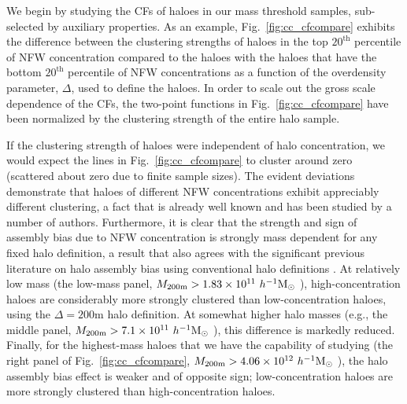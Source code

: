 \documentclass[usenatbib,fleqn]{mnras}
\begin{document}
We begin by studying the CFs of haloes in our mass threshold samples, sub-selected by auxiliary properties. As an example, Fig.~\ref{fig:cc_cfcompare} exhibits the difference between the clustering strengths of haloes in the top $20^{\mathrm{th}}$ percentile of NFW concentration compared to the haloes with the haloes that have the
bottom $20^{\mathrm{th}}$ percentile of NFW concentrations as a function of the overdensity parameter, $\Delta$, used to define the haloes. In order to scale out the gross scale dependence of the CFs, the two-point functions in Fig.~\ref{fig:cc_cfcompare} have been normalized by the clustering strength of the entire halo sample. 

If the clustering strength of haloes were independent of halo concentration, we would expect the lines in Fig.~\ref{fig:cc_cfcompare} to cluster around zero (scattered about zero due to finite sample sizes). The evident deviations demonstrate that haloes of different NFW concentrations exhibit appreciably different clustering, a fact that is already well known and has been studied by a number of authors. Furthermore, it is clear that the strength and sign of assembly bias due to NFW concentration is 
strongly mass dependent for any fixed halo definition, a result that also agrees with the significant previous literature on halo assembly bias using conventional halo definitions \citep{wechsler_etal02, gao_etal05, zentner07, wechsler_etal06, harker_etal06, croton_etal07, dalal_etal08, mao_etal15, sunayama_etal16}. At relatively low mass (the low-mass panel, $M_{200\text{m}} > 1.83 \times 10^{11} \ h^{-1}\mathrm{M}_{\odot}~$), high-concentration haloes are considerably more strongly clustered than low-concentration haloes, using the $\Delta = 200$m halo definition. At somewhat higher halo masses (e.g., the middle panel, $M_{200\text{m}} > 7.1 \times 10^{11} \ h^{-1}\mathrm{M}_{\odot}~$), this difference is markedly reduced. Finally, for the highest-mass haloes that we have the capability of studying (the right panel of Fig.~\ref{fig:cc_cfcompare}, $M_{200\text{m}} > 4.06 \times 10^{12} \ h^{-1}\mathrm{M}_{\odot}~$), the halo assembly bias effect is weaker and of opposite sign; low-concentration haloes are more strongly clustered than high-concentration haloes.
\end{document}
